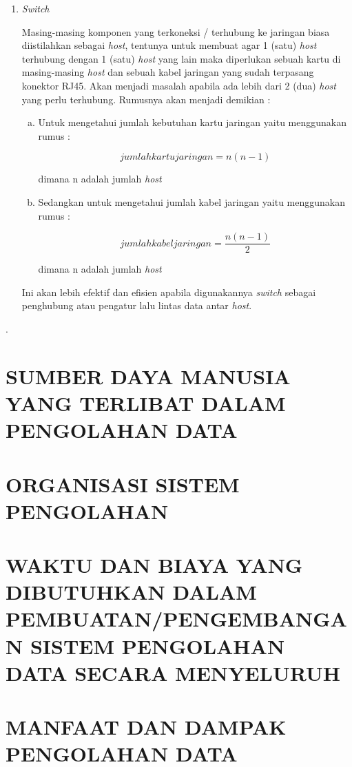 \documentclass[pdftex,12pt, oneside]{article}
\begin{document}
\begin{enumerate}[1.]
  \item \textit{Switch}
  
Masing-masing komponen yang terkoneksi / terhubung ke jaringan biasa diistilahkan sebagai \textit{host}, tentunya untuk membuat agar 1 (satu) \textit{host} terhubung dengan 1 (satu) \textit{host} yang lain maka diperlukan sebuah kartu di masing-masing \textit{host} dan sebuah kabel jaringan yang sudah terpasang konektor RJ45. Akan menjadi masalah apabila ada lebih dari 2 (dua) \textit{host} yang perlu terhubung. Rumusnya akan menjadi demikian :

\begin{enumerate}[a.]
  \item Untuk mengetahui jumlah kebutuhan kartu jaringan yaitu menggunakan rumus :

\begin{equation}
  jumlah kartu jaringan = n(n-1)
\end{equation}

dimana n adalah jumlah \textit{host}
  
  \item Sedangkan untuk mengetahui jumlah kabel jaringan yaitu menggunakan rumus :
  
\begin{equation}
  jumlah kabel jaringan = \frac{n(n-1)}{2}
\end{equation}
  
dimana n adalah jumlah \textit{host}
\end{enumerate}

Ini akan lebih efektif dan efisien apabila digunakannya \textit{switch} sebagai penghubung atau pengatur lalu lintas data antar \textit{host}.

\end{enumerate}.

\section{SUMBER DAYA MANUSIA YANG TERLIBAT DALAM PENGOLAHAN DATA}


\section{ORGANISASI SISTEM PENGOLAHAN}


\section{WAKTU DAN BIAYA YANG DIBUTUHKAN DALAM PEMBUATAN/PENGEMBANGAN SISTEM PENGOLAHAN DATA SECARA MENYELURUH}


\section{MANFAAT DAN DAMPAK PENGOLAHAN DATA}
\end{document}
